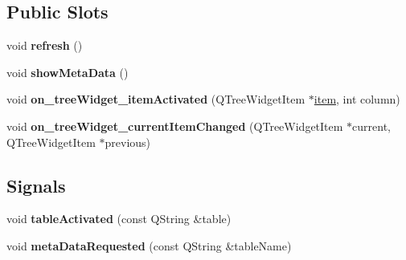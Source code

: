 \subsection*{Public Slots}
\begin{DoxyCompactItemize}
\item 
void {\bfseries refresh} ()\hypertarget{classconnectionMenu_a2ba8cffd81c1999c1dc02d3c915aa0fd}{}\label{classconnectionMenu_a2ba8cffd81c1999c1dc02d3c915aa0fd}

\item 
void {\bfseries show\+Meta\+Data} ()\hypertarget{classconnectionMenu_a4f1bc8eef79553047e8f00bbac27cb7b}{}\label{classconnectionMenu_a4f1bc8eef79553047e8f00bbac27cb7b}

\item 
void {\bfseries on\+\_\+tree\+Widget\+\_\+item\+Activated} (Q\+Tree\+Widget\+Item $\ast$\hyperlink{classitem}{item}, int column)\hypertarget{classconnectionMenu_aa51b970037b45ebdfe48efcb8d38fa23}{}\label{classconnectionMenu_aa51b970037b45ebdfe48efcb8d38fa23}

\item 
void {\bfseries on\+\_\+tree\+Widget\+\_\+current\+Item\+Changed} (Q\+Tree\+Widget\+Item $\ast$current, Q\+Tree\+Widget\+Item $\ast$previous)\hypertarget{classconnectionMenu_abfedee549afa5443963d10f9b5635e56}{}\label{classconnectionMenu_abfedee549afa5443963d10f9b5635e56}

\end{DoxyCompactItemize}
\subsection*{Signals}
\begin{DoxyCompactItemize}
\item 
void {\bfseries table\+Activated} (const Q\+String \&table)\hypertarget{classconnectionMenu_adfabb4075809b77b3c2ac9cd4188db35}{}\label{classconnectionMenu_adfabb4075809b77b3c2ac9cd4188db35}

\item 
void {\bfseries meta\+Data\+Requested} (const Q\+String \&table\+Name)\hypertarget{classconnectionMenu_ab48ece3cff2996fb996d05935211af0c}{}\label{classconnectionMenu_ab48ece3cff2996fb996d05935211af0c}

\end{DoxyCompactItemize}
